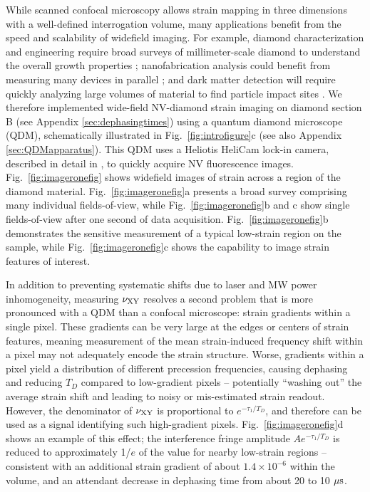 \documentclass[reprint,superscriptaddress,hyphens,amsmath,amssymb,aps,prx,float]{revtex4-2}
\begin{document}
While scanned confocal microscopy allows strain mapping in three dimensions with a well-defined interrogation volume, many applications benefit from the speed and scalability of widefield imaging.  For example, diamond characterization and engineering require broad surveys of millimeter-scale diamond to understand the overall growth properties \cite{PurpleDiamond,Friel2009}; nanofabrication analysis could benefit from measuring many devices in parallel \cite{KnauerFabStrain2020}; and dark matter detection will require quickly analyzing large volumes of material to find particle impact sites \cite{MarshallQST2021}.  We therefore implemented wide-field NV-diamond strain imaging on diamond section B (see Appendix \ref{sec:dephasingtimes}) using a quantum diamond microscope (QDM), schematically illustrated in Fig.~\ref{fig:introfigure}c (see also Appendix \ref{sec:QDMapparatus}).  This QDM uses a Heliotis HeliCam lock-in camera, described in detail in \cite{DQ4R}, to quickly acquire NV fluorescence images.  Fig.~\ref{fig:imageronefig} shows widefield images of strain across a region of the diamond material.  Fig.~\ref{fig:imageronefig}a presents a broad survey comprising many individual fields-of-view, while Fig.~\ref{fig:imageronefig}b and c show single fields-of-view after one second of data acquisition.  Fig.~\ref{fig:imageronefig}b demonstrates the sensitive measurement of a typical low-strain region on the sample, while Fig.~\ref{fig:imageronefig}c shows the capability to image strain features of interest.  

In addition to preventing systematic shifts due to laser and MW power inhomogeneity, measuring $\nu_{\rm XY}$ resolves a second problem that is more pronounced with a QDM than a confocal microscope: strain gradients within a single pixel.  These gradients can be very large at the edges or centers of strain features, meaning measurement of the mean strain-induced frequency shift within a pixel may not adequately encode the strain structure.  Worse, gradients within a pixel yield a distribution of different precession frequencies, causing dephasing and reducing $T_D$ compared to low-gradient pixels -- potentially ``washing out'' the average strain shift and leading to noisy or mis-estimated strain readout.  However, the denominator of $\nu_{\rm XY}$ is proportional to $e^{-\tau_1/T_D}$, and therefore can be used as a signal identifying such high-gradient pixels.  Fig.~\ref{fig:imageronefig}d shows an example of this effect; the interference fringe amplitude $Ae^{-\tau_1/T_D}$ is reduced to approximately 1/$e$ of the value for nearby low-strain regions -- consistent with an additional strain gradient of about $1.4\times10^{-6}$ within the volume, and an attendant decrease in dephasing time from about 20 to 10 $\rm{\mu s}$.
\end{document}
